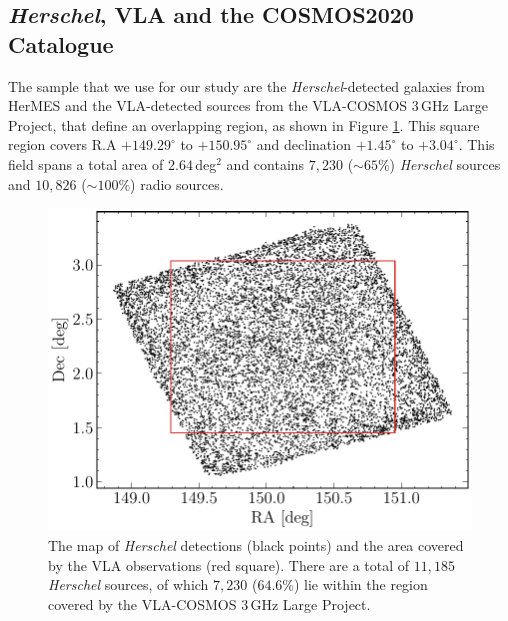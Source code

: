 \subsection{\textit{Herschel}, VLA and the COSMOS2020 Catalogue}

The sample that we use for our study are the \textit{Herschel}-detected galaxies from HerMES and the VLA-detected sources from the VLA-COSMOS $3\,$GHz Large Project, that define an overlapping region, as shown in Figure \ref{fig:sky_map}. This square region covers R.A  $+149.29^{\circ}$ to $+150.95^{\circ}$ and declination $+1.45^{\circ}$ to $+3.04^{\circ}$. This field spans a total area of $2.64\,$deg$^2$ and contains $7,230$ ($\sim 65\%$) \textit{Herschel} sources and $10,826$ ($\sim 100\%$) radio sources.

\begin{figure}
	\centering
	\includegraphics[width=0.8\columnwidth]{Figures/sky_map.pdf}
	\caption[Map of the \textit{Herschel} and VLA observations in the COSMOS field]{The map of \textit{Herschel} detections (black points) and the area covered by the VLA observations (red square). There are a total of $11,185$ \textit{Herschel} sources, of which $7,230$ ($64.6$\%) lie within the region covered by the VLA-COSMOS $3\,$GHz Large Project.}
	\label{fig:sky_map}
\end{figure}

